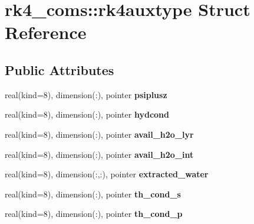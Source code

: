 \hypertarget{structrk4__coms_1_1rk4auxtype}{
\section{rk4\_\-coms::rk4auxtype Struct Reference}
\label{structrk4__coms_1_1rk4auxtype}
}
\subsection*{Public Attributes}
\begin{DoxyCompactItemize}
\item 
\hypertarget{structrk4__coms_1_1rk4auxtype_a3a63efb8517a13c44afd5727c4537c9f}{
real(kind=8), dimension(:), pointer {\bfseries psiplusz}}
\label{structrk4__coms_1_1rk4auxtype_a3a63efb8517a13c44afd5727c4537c9f}

\item 
\hypertarget{structrk4__coms_1_1rk4auxtype_a81907863193424dae9b0bad1fcbdccea}{
real(kind=8), dimension(:), pointer {\bfseries hydcond}}
\label{structrk4__coms_1_1rk4auxtype_a81907863193424dae9b0bad1fcbdccea}

\item 
\hypertarget{structrk4__coms_1_1rk4auxtype_a18a773b33ab1931a3f957dac0e5b52a2}{
real(kind=8), dimension(:), pointer {\bfseries avail\_\-h2o\_\-lyr}}
\label{structrk4__coms_1_1rk4auxtype_a18a773b33ab1931a3f957dac0e5b52a2}

\item 
\hypertarget{structrk4__coms_1_1rk4auxtype_ae6a4dbf4a2fd6401d5e0c0122389fa5c}{
real(kind=8), dimension(:), pointer {\bfseries avail\_\-h2o\_\-int}}
\label{structrk4__coms_1_1rk4auxtype_ae6a4dbf4a2fd6401d5e0c0122389fa5c}

\item 
\hypertarget{structrk4__coms_1_1rk4auxtype_a55a1d58da1675685fcf52bf5a5dc1624}{
real(kind=8), dimension(:,:), pointer {\bfseries extracted\_\-water}}
\label{structrk4__coms_1_1rk4auxtype_a55a1d58da1675685fcf52bf5a5dc1624}

\item 
\hypertarget{structrk4__coms_1_1rk4auxtype_a7b679bb8818d2a9b289c8a0bc96f6980}{
real(kind=8), dimension(:), pointer {\bfseries th\_\-cond\_\-s}}
\label{structrk4__coms_1_1rk4auxtype_a7b679bb8818d2a9b289c8a0bc96f6980}

\item 
\hypertarget{structrk4__coms_1_1rk4auxtype_a1fde86e395e47f8b84c73dc40846881e}{
real(kind=8), dimension(:), pointer {\bfseries th\_\-cond\_\-p}}
\label{structrk4__coms_1_1rk4auxtype_a1fde86e395e47f8b84c73dc40846881e}


\end{DoxyCompactItemize}
